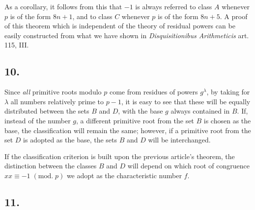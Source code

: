 \documentclass[twoside,12pt]{memoir}
\renewcommand{\pmod}[1]{\;(\textrm{mod.}\;#1)}
\begin{document}
As a corollary, it follows from this that \(-1\) is always referred to class \(A\) whenever \(p\) is of the form \(8n+1\), and to class \(C\) whenever \(p\) is of the form \(8n+5\).  A proof of this theorem which is independent of the theory of residual powers can be easily constructed from what we have shown in \textit{Disquisitionibus Arithmeticis} art. 115, III.
%

\subsection*{10.}
 
Since \textit{all} primitive roots modulo \(p\) come from residues of powers \(g^{\lambda}\), by taking for \(\lambda\) all numbers relatively prime to \(p-1\), it is easy to see that these will be equally distributed between the sets \({B}\) and \({D}\), with the base \(g\) always contained in \({B}\). If, instead of the number \(g\), a different primitive root from the set \(B\) is chosen as the base, the classification will remain the same; however, if a primitive root from the set \(D\) is adopted as the base, the sets \(B\) and \(D\) will be interchanged.
 
If the classification criterion is built upon the previous article's theorem, the distinction between the classes \(B\) and \(D\) will depend on which root of congruence \(x x \equiv-1\pmod{p}\) we adopt as the characteristic number \(f\).
%

\subsection*{11.}
 
\end{document}
